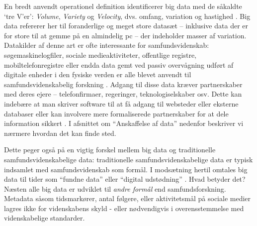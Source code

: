 \documentclass[12pt,]{article}
\begin{document}
En bredt anvendt operationel definition identificerer big data med de
såkaldte `tre V'er': \emph{Volume}, \emph{Variety} og \emph{Velocity},
dvs. omfang, variation og hastighed \citep{laney01}. Big data refererer
her til foranderlige og meget store datasæt -- inklusive data der er for
store til at gemme på en almindelig pc -- der indeholder masser af
variation. Datakilder af denne art er ofte interessante for
samfundsvidenskab: søgemaskinelogfiler, sociale medieaktiviteter,
offentlige registre, mobiltelefonregistre eller endda data gemt ved
passiv overvågning udført af digitale enheder i den fysiske verden er
alle blevet anvendt til samfundsvidenskabelig forskning
\citep{salganik17}. Adgang til disse data kræver partnerskaber med deres
ejere -- telefonfirmaer, regeringer, teknologiselskaber osv. Dette kan
indebære at man skriver software til at få adgang til websteder eller
eksterne databaser eller kan involvere mere formaliserede partnerskaber
for at dele information sikkert \citep{EL14}. I afsnittet om
``Anskaffelse af data'' nedenfor beskriver vi nærmere hvordan det kan
finde sted.

Dette peger også på en vigtig forskel mellem big data og traditionelle
samfundsvidenskabelige data: traditionelle samfundsvidenskabelige data
er typisk indsamlet med samfundsvidenskab som formål. I modsætning
hertil omtales big data til tider som ``fundne data'' eller ``digital
udstødning'' \citep{harford14}. Hvad betyder det? Næsten alle big data
er udviklet til \emph{andre formål} end samfundsforskning. Metadata
såsom tidsmarkører, antal følgere, eller aktivitetsmål på sociale medier
lagres ikke for videnskabens skyld - eller nødvendigvis i
overensstemmelse med videnskabelige standarder.
\end{document}
